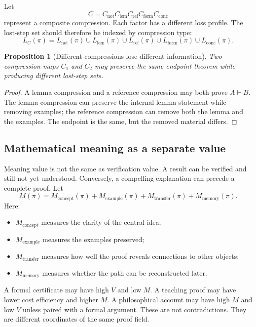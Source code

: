 \documentclass[11pt]{article}
\newtheorem{proposition}[theorem]{Proposition}
\theoremstyle{definition}
\theoremstyle{remark}
\begin{document}
Let
\[
        C=C_{\mathrm{not}}C_{\mathrm{lem}}C_{\mathrm{ref}}C_{\mathrm{form}}C_{\mathrm{conc}}
\]
represent a composite compression.  Each factor has a different loss profile.  The lost-step set should therefore be indexed by compression type:
\[
        L_C(\pi)=L_{\mathrm{not}}(\pi)\cup L_{\mathrm{lem}}(\pi)\cup L_{\mathrm{ref}}(\pi)\cup L_{\mathrm{form}}(\pi)\cup L_{\mathrm{conc}}(\pi).
\]

\begin{proposition}[Different compressions lose different information]
Two compression maps $C_1$ and $C_2$ may preserve the same endpoint theorem while producing different lost-step sets.
\end{proposition}

\begin{proof}
A lemma compression and a reference compression may both prove $A\vdash B$.  The lemma compression can preserve the internal lemma statement while removing examples; the reference compression can remove both the lemma and the examples.  The endpoint is the same, but the removed material differs.
\end{proof}

\subsection{Mathematical meaning as a separate value}

Meaning value is not the same as verification value.  A result can be verified and still not yet understood.  Conversely, a compelling explanation can precede a complete proof.  Let
\[
        M(\pi)=M_{\mathrm{concept}}(\pi)+M_{\mathrm{example}}(\pi)+M_{\mathrm{transfer}}(\pi)+M_{\mathrm{memory}}(\pi).
\]
Here:
\begin{itemize}
\item $M_{\mathrm{concept}}$ measures the clarity of the central idea;
\item $M_{\mathrm{example}}$ measures the examples preserved;
\item $M_{\mathrm{transfer}}$ measures how well the proof reveals connections to other objects;
\item $M_{\mathrm{memory}}$ measures whether the path can be reconstructed later.
\end{itemize}

A formal certificate may have high $V$ and low $M$.  A teaching proof may have lower cost efficiency and higher $M$.  A philosophical account may have high $M$ and low $V$ unless paired with a formal argument.  These are not contradictions.  They are different coordinates of the same proof field.
\end{document}
